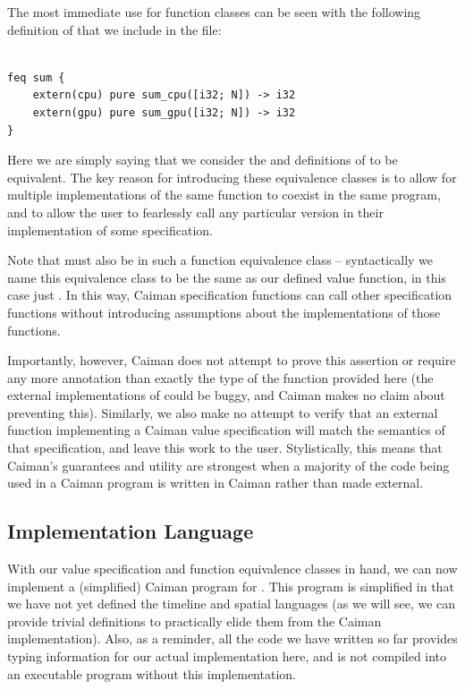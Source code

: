 The most immediate use for function classes can be seen with the following definition of  that we include in the  file:
%
\begin{lstlisting}

feq sum {
    extern(cpu) pure sum_cpu([i32; N]) -> i32
    extern(gpu) pure sum_gpu([i32; N]) -> i32
}
\end{lstlisting}
%
Here we are simply saying that we consider the  and  definitions of  to be equivalent.  The key reason for introducing these equivalence classes is to allow for multiple implementations of the same function to coexist in the same program, and to allow the user to fearlessly call any particular version in their implementation of some specification.  

Note that  must also be in such a function equivalence class -- syntactically we name this equivalence class to be the same as our defined value function, in this case just .  In this way, Caiman specification functions can call other specification functions without introducing assumptions about the implementations of those functions.  

Importantly, however, Caiman does not attempt to prove this assertion or require any more annotation than exactly the type of the function provided here (the external implementations of  could be buggy, and Caiman makes no claim about preventing this).  Similarly, we also make no attempt to verify that an external function implementing a Caiman value specification will match the semantics of that specification, and leave this work to the user.  Stylistically, this means that Caiman's guarantees and utility are strongest when a majority of the code being used in a Caiman program is written in Caiman rather than made external.  

\subsection{Implementation Language}
\label{subsec:implementation}

With our value specification and function equivalence classes in hand, we can now implement a (simplified) Caiman program for .  This program is simplified in that we have not yet defined the timeline and spatial languages (as we will see, we can provide trivial definitions to practically elide them from the Caiman implementation).  Also, as a reminder, all the code we have written so far provides typing information for our actual implementation here, and is not compiled into an executable program without this implementation.

